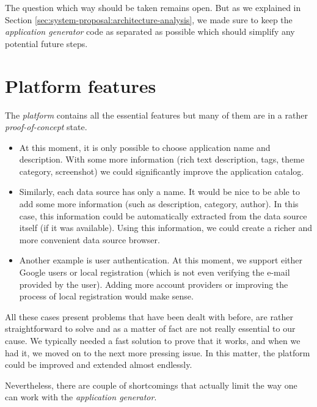 The question which way should be taken remains open. But as we explained in Section \ref{sec:system-proposal:architecture-analysis}, we made sure to keep the \emph{application generator} code as separated as possible which should simplify any potential future steps. 

\section{Platform features}

The \emph{platform} contains all the essential features but many of them are in a rather \emph{proof-of-concept} state.

\begin{itemize}
\item At this moment, it is only possible to choose application name and description. With some more information (rich text description, tags, theme category, screenshot) we could significantly improve the application catalog.
\item Similarly, each data source has only a name. It would be nice to be able to add some more information (such as description, category, author). In this case, this information could be automatically extracted from the data source itself (if it was available). Using this information, we could create a richer and more convenient data source browser. 
\item Another example is user authentication. At this moment, we support either Google users or local registration (which is not even verifying the e-mail provided by the user). Adding more account providers or improving the process of local registration would make sense.
\end{itemize}

All these cases present problems that have been dealt with before, are rather straightforward to solve and as a matter of fact are not really essential to our cause. We typically needed a fast solution to prove that it works, and when we had it, we moved on to the next more pressing issue. In this matter, the platform could be improved and extended almost endlessly.

Nevertheless, there are couple of shortcomings that actually limit the way one can work with the \emph{application generator}. 

